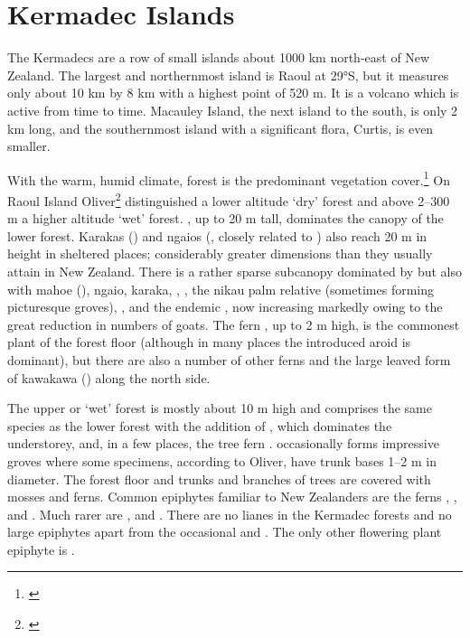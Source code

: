 \section{Kermadec Islands}

The Kermadecs are a row of small islands about 1000 km north-east of New Zealand.
The largest and northernmost island is Raoul at 29°S, but it measures only about 10 km by 8 km with a highest point of 520 m.
It is a volcano which is active from time to time.
Macauley Island, the next island to the south, is only 2 km long, and the southernmost island with a significant flora, Curtis, is even smaller.

With the warm, humid climate, forest is the predominant vegetation cover.\footnote{\cite{sykes1977annotated}}
On Raoul Island Oliver\footnote{\cite{oliver1910vegetation}} distinguished a lower altitude `dry' forest and above 2–300 m a higher altitude `wet' forest. , up to 20 m tall, dominates the canopy of the lower forest.
Karakas () and ngaios (, closely related to ) also reach 20 m in height in sheltered places; considerably greater dimensions than they usually attain in New Zealand.
There is a rather sparse subcanopy dominated by  but also with mahoe (), ngaio, karaka, , , the nikau palm relative  (sometimes forming picturesque groves), , and the endemic , now increasing markedly owing to the great reduction in numbers of goats.
The fern , up to 2 m high, is the commonest plant of the forest floor (although in many places the introduced aroid  is dominant), but there are also a number of other ferns and the large leaved form of kawakawa () along the north side.

The upper or `wet' forest is mostly about 10 m high and comprises the same species as the lower forest with the addition of , which dominates the understorey, and, in a few places, the tree fern .  occasionally forms impressive groves where some specimens, according to Oliver, have trunk bases 1–2 m in diameter.
The forest floor and trunks and branches of trees are covered with mosses and ferns.
Common epiphytes familiar to New Zealanders are the ferns , ,  and .
Much rarer are ,  and .
There are no lianes in the Kermadec forests and no large epiphytes apart from the occasional  and .
The only other flowering plant epiphyte is .

